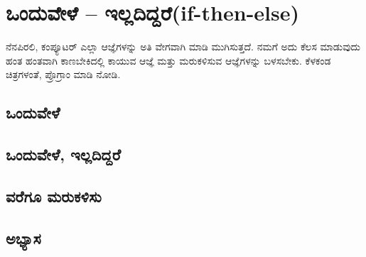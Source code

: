 \chapter{ಒಂದುವೇಳೆ – ಇಲ್ಲದಿದ್ದರೆ(\textenglish{if-then-else})}
ನೆನಪಿರಲಿ, ಕಂಪ್ಯೂಟರ್ ಎಲ್ಲಾ ಆಜ್ಞೆಗಳನ್ನು ಅತಿ ವೇಗವಾಗಿ ಮಾಡಿ ಮುಗಿಸುತ್ತದೆ. ನಮಗೆ ಅದು ಕೆಲಸ ಮಾಡುವುದು ಹಂತ ಹಂತವಾಗಿ ಕಾಣಬೇಕಿದಲ್ಲಿ ಕಾಯುವ ಆಜ್ಞೆ ಮತ್ತು ಮರುಕಳಿಸುವ ಆಜ್ಞೆಗಳನ್ನು ಬಳಸಬೇಕು. ಕೆಳಕಂಡ ಚಿತ್ರಗಳಂತೆ, ಪ್ರೊಗ್ರಾಂ ಮಾಡಿ ನೋಡಿ. 
\section{ಒಂದುವೇಳೆ}

\section{ಒಂದುವೇಳೆ, ಇಲ್ಲದಿದ್ದರೆ}

\section{ವರೆಗೂ ಮರುಕಳಿಸು} 

\section{ಅಭ್ಯಾಸ }